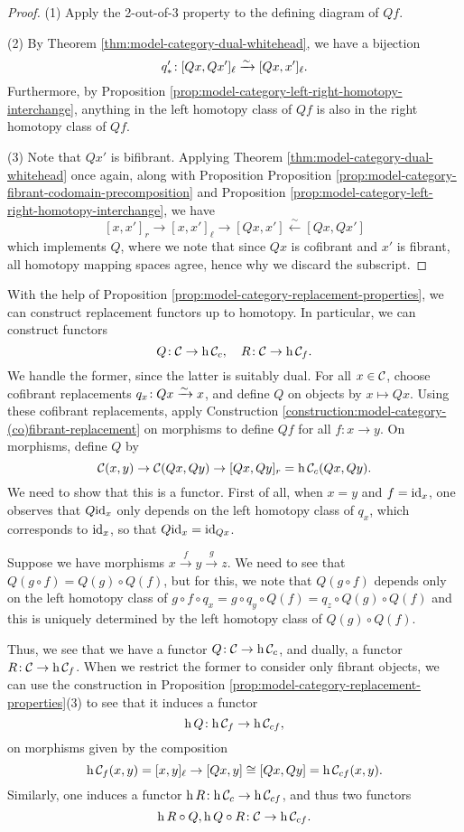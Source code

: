 \begin{proof}
(1) Apply the 2-out-of-3 property to the defining diagram of \(Qf\).

(2) By Theorem \ref{thm:model-category-dual-whitehead}, we have a bijection
\[ q'_*\!:[Qx,Qx']_\ell \xrightarrow{\sim} [Qx,x']_\ell. \]
Furthermore, by Proposition \ref{prop:model-category-left-right-homotopy-interchange}, anything in the left homotopy class of \(Qf\) is also in the right homotopy class of \(Qf\).

(3) Note that \(Qx'\) is bifibrant. Applying Theorem \ref{thm:model-category-dual-whitehead} once again, along with Proposition Proposition \ref{prop:model-category-fibrant-codomain-precomposition}
and Proposition \ref{prop:model-category-left-right-homotopy-interchange}, we have
\[ [x,x']_r \to [x,x']_\ell \to [Qx,x'] \xleftarrow{\sim} [Qx,Qx'] \]
which implements \(Q\), where we note that since \(Qx\) is cofibrant and \(x'\) is fibrant, all homotopy mapping spaces agree, hence why we discard the subscript.
\end{proof}

\begin{construction}
	With the help of Proposition \ref{prop:model-category-replacement-properties}, we can construct replacement functors up to homotopy. In particular, we can construct
	functors
	\[ Q\!:\mathcal{C}\to\operatorname{h}{\mathcal{C}_c},\quad R\!:\mathcal{C}\to\operatorname{h}{\mathcal{C}_f}. \]
	We handle the former, since the latter is suitably dual. For all \(x\in\mathcal{C}\), choose cofibrant replacements \(q_x\!:Qx\xrightarrow{\sim} x\), and define \(Q\) on objects by
	\(x\mapsto Qx\). Using these cofibrant replacements, apply Construction \ref{construction:model-category-(co)fibrant-replacement} on morphisms to define \(Qf\) for all \(f\!:x\to y\).
	On morphisms, define \(Q\) by
	\[ \mathcal{C}(x,y) \to \mathcal{C}(Qx,Qy) \to [Qx,Qy]_r = \operatorname{h}{\mathcal{C}_c}(Qx,Qy). \]
	We need to show that this is a functor. First of all, when \(x=y\) and \(f=\mathrm{id}_x\), one observes that \(Q\mathrm{id}_x\) only depends on the left homotopy class of \(q_x\), which corresponds to \(\mathrm{id}_x\),
	so that \(Q\mathrm{id}_x = \mathrm{id}_{Qx}\).

	Suppose we have morphisms \(x\overset{f}\to y\overset{g}\to z\). We need to see that \(Q(g\circ f) = Q(g)\circ Q(f)\), but for this, we note that \(Q(g\circ f)\) depends only
	on the left homotopy class of \(g\circ f\circ q_x = g\circ q_y \circ Q(f) = q_z\circ Q(g)\circ Q(f)\) and this is uniquely determined by the left homotopy class
	of \(Q(g)\circ Q(f)\).

	Thus, we see that we have a functor \(Q\!:\mathcal{C}\to\operatorname{h}{\mathcal{C}_{c}}\), and dually, a functor \(R\!:\mathcal{C}\to\operatorname{h}{\mathcal{C}_{f}}\). When we restrict the former to consider
	only fibrant objects, we can use the construction in Proposition \ref{prop:model-category-replacement-properties}(3) to see that it induces a functor
	\[ \operatorname{h}{Q}\!:\operatorname{h}{\mathcal{C}_f}\to\operatorname{h}{\mathcal{C}_{cf}}, \]
	on morphisms given by the composition
	\[ \operatorname{h}{\mathcal{C}_f}(x,y) = [x,y]_\ell \to [Qx,y] \cong [Qx,Qy] = \operatorname{h}{\mathcal{C}_{cf}}(x,y). \]
	Similarly, one induces a functor \(\operatorname{h}{R}\!:\operatorname{h}{\mathcal{C}_c}\to\operatorname{h}{\mathcal{C}_{cf}}\), and thus two functors
	\[ \operatorname{h}{R}\circ Q, \operatorname{h}{Q}\circ R\!: \mathcal{C}\to\operatorname{h}{\mathcal{C}_{cf}}. \]
\end{construction}

